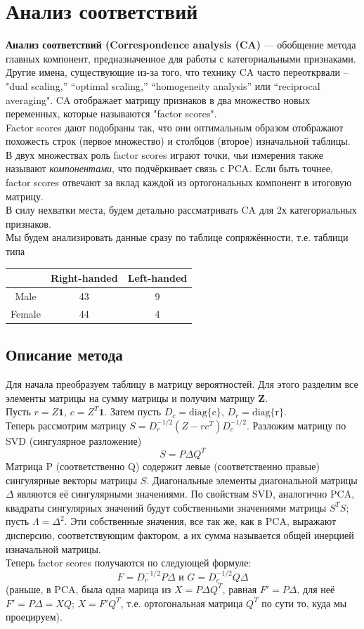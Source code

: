 \section{Анализ соответствий}
\textbf{Анализ соответствий (Correspondence analysis (CA)} — обобщение метода главных компонент, предназначенное для работы с
категориальными признаками. Другие имена, существующие из-за того, что технику CA часто переоткрвали -- "dual scaling,” “optimal scaling,” “homogeneity analysis” или “reciprocal averaging". CA отображает матрицу признаков в два множество новых переменных, которые называются "factor scores".\\
Factor scores  дают подобраны так, что они оптимальным образом отображают похожесть строк (первое множество) и столбцов (второе) изначальной таблицы. В двух множествах роль factor scores играют точки, чьи  измерения также называют \textit{компонентами}, что подчёркивает связь с PCA. Если быть точнее, factor scores отвечают за вклад каждой из ортогональных компонент в итоговую матрицу.\\
В силу нехватки места, будем детально рассматривать CA для 2х категориальных признаков.\\
Мы будем анализировать данные сразу по таблице сопряжённости, т.е. таблици типа
\begin{table}[H]\centering
    \begin{tabular}{|c|c|c|}
        \hline        & Right-handed & Left-handed \\
        \hline Male   & 43           & 9           \\
        \hline Female & 44           & 4           \\
        \hline
    \end{tabular}
\end{table}
\subsection{Описание метода}
Для начала преобразуем таблицу в матрицу вероятностей. Для этого разделим все элементы матрицы на сумму матрицы и получим матрицу \textbf{Z}.\\
Пусть $r=Z\textbf{1}$, $c=Z^T\textbf{1}$. Затем пусть $D_c=\text{diag\{c\}}$, $D_r=\text{diag\{r\}}$.\\
Теперь рассмотрим матрицу $S=D_r^{-1/2}(Z-rc^T)D_c^{-1/2}$.
Разложим матрицу по SVD (сингулярное разложение)
$$S=P\Delta Q^T$$
Матрица P (соответственно Q) содержит левые
(соответственно правые) сингулярные векторы матрицы $S$. Диагональные элементы
диагональной матрицы $\Delta$ являются её сингулярными значениями.
По свойствам SVD, аналогично PCA, квадраты сингулярных значений будут собственными значениями матрицы $S^TS$; пусть $\Lambda=\Delta^2$. Эти собственные значения, все так же, как в PCA, выражают дисперсию, соответствующим фактором, а их сумма называется общей инерцией изначальной матрицы.\\
Теперь factor scores получаются по следующей формуле:
$$F=D_r^{-1/2}P\Delta\text{ и }G=D_c^{-1/2}Q\Delta$$
(раньше, в PCA, была одна марица из $X=P\Delta Q^T$, равная $F'=P\Delta$, для неё $F'=P\Delta=XQ$; $X=F'Q^T$, т.е. ортогональная матрица $Q^T$ по сути то, куда мы проецируем).
